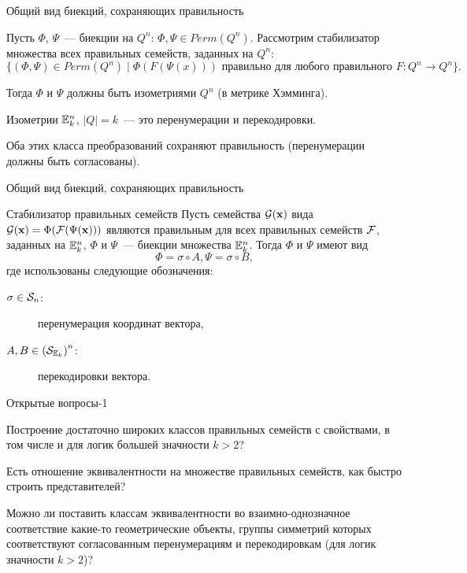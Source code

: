 \begin{frame}{Общий вид биекций, сохраняющих правильность}
    \begin{coloritemize}
        \item Пусть $\Phi$, $\Psi$~--- биекции на $Q^n$: $\Phi, \Psi \in Perm(Q^n)$.
        Рассмотрим стабилизатор множества всех правильных семейств, заданных на $Q^n$:
        \[
            \{(\Phi, \Psi) \in Perm(Q^n) \mid \Phi(F(\Psi(x))) \text{ правильно для любого правильного } F \colon Q^n \to Q^n \}.  
        \]
        \pause
        \item Тогда $\Phi$ и $\Psi$ должны быть изометриями $Q^n$ (в метрике Хэмминга).
        \pause
        \item Изометрии $\mathbb{E}_k^n$, $\lvert Q \rvert = k$~--- это перенумерации и перекодировки.
        \pause
        \item Оба этих класса преобразований сохраняют правильность (перенумерации должны быть согласованы).
    \end{coloritemize}   
\end{frame}


\begin{frame}{Общий вид биекций, сохраняющих правильность}
    \begin{mytheorem}{Стабилизатор правильных семейств}
        Пусть семейства $\mathcal{G}(\mathbf{x})$ вида $\mathcal{G}(\mathbf{x}) = \Phi(\mathcal{F}(\Psi(\mathbf{x})))$ являются правильным для всех правильных семейств $\mathcal{F}$, заданных на $\mathbb{E}_k^n$, $\Phi$ и $\Psi$~--- биекции множества $\mathbb{E}_k^n$.
        Тогда $\Phi$ и $\Psi$ имеют вид 
        \[
            \Phi = \sigma \circ A, \Psi = \sigma \circ B, 
        \]
        где использованы следующие обозначения:
        \begin{description}
            \item[$\sigma \in \mathcal{S}_n$:] перенумерация координат вектора,
            \item[$A, B \in \left( \mathcal{S}_{\mathbb{E}_k} \right)^n$:] перекодировки вектора. 
        \end{description}
    \end{mytheorem}
\end{frame}


\begin{frame}{Открытые вопросы-1}
    \begin{coloritemize}
        \item Построение достаточно широких классов правильных семейств с  свойствами, в том числе и для логик большей значности $k > 2$?
        \pause 
        \item Есть отношение эквивалентности на множестве правильных семейств, как быстро строить представителей?
        \pause 
        \item Можно ли поставить классам эквивалентности во взаимно-однозначное соответствие какие-то геометрические объекты, группы симметрий которых соответствуют согласованным перенумерациям и перекодировкам (для логик значности $k > 2$)?
    \end{coloritemize}
\end{frame}


